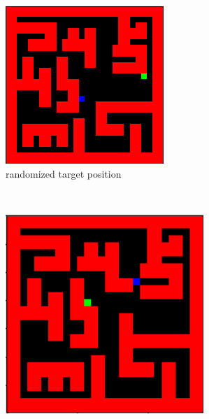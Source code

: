 \documentclass[a4paper,14pt]{article}
\begin{document}
\begin{figure}
    \centering
    \begin{subfigure}[b]{0.3\textwidth}
        \includegraphics[width=\textwidth]{random_target}
        \caption{randomized target position}
        \label{fig:randomtarget}
    \end{subfigure}
    ~ %
    \begin{subfigure}[b]{0.3\textwidth}
        \includegraphics[width=\textwidth]{modified_map}

\end{subfigure}
\end{figure}
\end{document}
